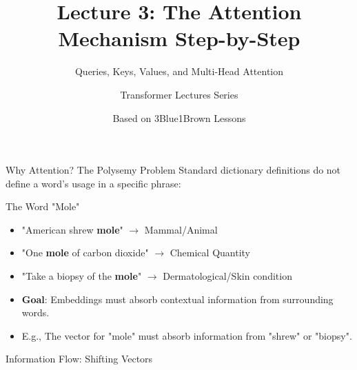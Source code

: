 \documentclass[aspectratio=169]{beamer}
\title{Lecture 3: The Attention Mechanism Step-by-Step}
\subtitle{Queries, Keys, Values, and Multi-Head Attention}
\author{Transformer Lectures Series}
\date{Based on 3Blue1Brown Lessons}
\begin{document}
\begin{frame}[plain]
  \titlepage
\end{frame}

\begin{frame}{Why Attention? The Polysemy Problem}
  Standard dictionary definitions do not define a word's usage in a specific phrase:
  
  \begin{exampleblock}{The Word "Mole"}
    \begin{itemize}
      \item "American shrew \textbf{mole}" $\rightarrow$ Mammal/Animal
      \item "One \textbf{mole} of carbon dioxide" $\rightarrow$ Chemical Quantity
      \item "Take a biopsy of the \textbf{mole}" $\rightarrow$ Dermatological/Skin condition
    \end{itemize}
  \end{exampleblock}
  
  \begin{itemize}
    \item \textbf{Goal}: Embeddings must absorb contextual information from surrounding words.
    \item E.g., The vector for "mole" must absorb information from "shrew" or "biopsy".
  \end{itemize}
\end{frame}

\begin{frame}{Information Flow: Shifting Vectors}
  \centering
\end{frame}
\end{document}

